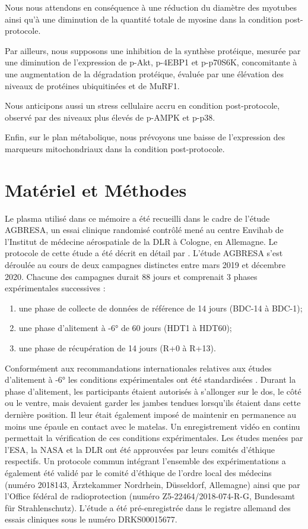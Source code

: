 \documentclass[11pt]{report}
\begin{document}
\medskip Nous nous attendons en conséquence à une réduction du diamètre des myotubes ainsi qu'à une diminution de la quantité totale de myosine dans la condition post-protocole. 

Par ailleurs, nous supposons une inhibition de la synthèse protéique, mesurée par une diminution de l'expression de p-Akt, p-4EBP1 et p-p70S6K, concomitante à une augmentation de la dégradation protéique, évaluée par une élévation des niveaux de protéines ubiquitinées et de MuRF1. 

Nous anticipons aussi un stress cellulaire accru en condition post-protocole, observé par des niveaux plus élevés de p-AMPK et p-p38.

Enfin, sur le plan métabolique, nous prévoyons une baisse de l'expression des marqueurs mitochondriaux dans la condition post-protocole.

\newpage

\chapter{Matériel et Méthodes}

Le plasma utilisé dans ce mémoire a été recueilli dans le cadre de l'étude AGBRESA, un essai clinique randomisé contrôlé mené au centre Envihab de l'Institut de médecine aérospatiale de la DLR à Cologne, en Allemagne. Le protocole de cette étude a été décrit en détail par \textcite{Clement2022Sep}. L'étude AGBRESA s'est déroulée au cours de deux campagnes distinctes entre mars 2019 et décembre 2020. Chacune des campagnes durait 88 jours et comprenait 3 phases expérimentales successives :
\begin{enumerate}
	\item[(1)] une phase de collecte de données de référence de 14 jours (BDC-14 à BDC-1);
	\item[(2)] une phase d'alitement à -6° de 60 jours (HDT1 à HDT60);
	\item[(3)] une phase de récupération de 14 jours (R+0 à R+13).
\end{enumerate}

Conformément aux recommandations internationales relatives aux études d'alitement à -6° les conditions expérimentales ont été standardisées \parencite{Sundblad2016Jul}. Durant la phase d'alitement, les participants étaient autorisés à s'allonger sur le dos, le côté ou le ventre, mais devaient garder les jambes tendues lorsqu'ils étaient dans cette dernière position. Il leur était également imposé de maintenir en permanence au moins une épaule en contact avec le matelas. Un enregistrement vidéo en continu permettait la vérification de ces conditions expérimentales. Les études menées par l'ESA, la NASA et la DLR ont été approuvées par leurs comités d'éthique respectifs. Un protocole commun intégrant l'ensemble des expérimentations a également été validé par le comité d'éthique de l'ordre local des médecins (numéro 2018143, Ärztekammer Nordrhein, Düsseldorf, Allemagne) ainsi que par l'Office fédéral de radioprotection (numéro Z5-22464/2018-074-R-G, Bundesamt für Strahlenschutz). L'étude a été pré-enregistrée dans le registre allemand des essais cliniques sous le numéro DRKS00015677.
\end{document}
